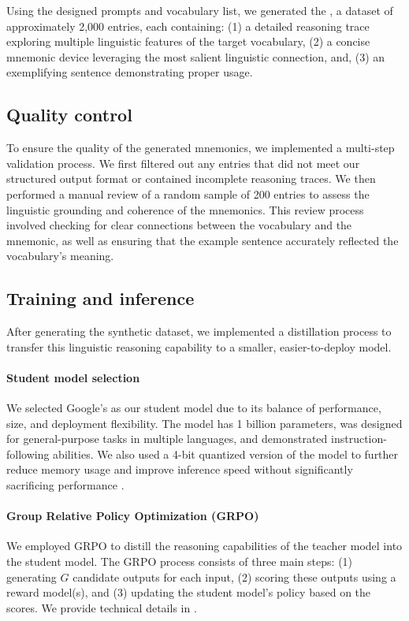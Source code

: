 Using the designed prompts and vocabulary list, we generated the \links, a dataset of approximately 2,000 entries, each containing: (1) a detailed reasoning trace exploring multiple linguistic features of the target vocabulary, (2) a concise mnemonic device leveraging the most salient linguistic connection, and, (3) an exemplifying sentence demonstrating proper usage.

\subsection{Quality control} To ensure the quality of the generated mnemonics, we implemented a multi-step validation process. We first filtered out any entries that did not meet our structured output format or contained incomplete reasoning traces. We then performed a manual review of a random sample of 200 entries to assess the linguistic grounding and coherence of the mnemonics. This review process involved checking for clear connections between the vocabulary and the mnemonic, as well as ensuring that the example sentence accurately reflected the vocabulary's meaning.

\subsection{Training and inference} \label{sec:training-inference}
After generating the synthetic dataset, we implemented a distillation process to transfer this linguistic reasoning capability to a smaller, easier-to-deploy model.

\paragraph*{Student model selection} We selected Google's \studentmodel \citep{GemmaTeamGEMMA2025} as our student model due to its balance of performance, size, and deployment flexibility. The model has 1 billion parameters, was designed for general-purpose tasks in multiple languages, and demonstrated instruction-following abilities. We also used a 4-bit quantized version of the model to further reduce memory usage and improve inference speed without significantly sacrificing performance \citep{dettmersQLoRAEfficientFinetuning2023}.

\paragraph*{Group Relative Policy Optimization (GRPO)} We employed GRPO \citep{DeepSeek-AIDEEPSEEKR12025} to distill the reasoning capabilities of the teacher model into the student model. The GRPO process consists of three main steps: (1) generating $G$ candidate outputs for each input, (2) scoring these outputs using a reward model(s), and (3) updating the student model's policy based on the scores. We provide technical details in .

